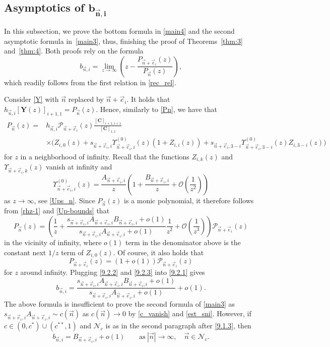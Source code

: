 \documentclass[pdftex]{sigma}
\numberwithin{equation}{section}
\newcommand{\n}{{\vec n}}
\begin{document}
\subsection[Asymptotics of b\_n,i]{Asymptotics of $\boldsymbol{b_{\n,i} }$}

In this subsection, we prove the bottom formula in \eqref{main4} and the second asymptotic formula in~\eqref{main3}, thus, finishing the proof of Theorems~\ref{thm:3} and~\ref{thm:4}. Both proofs rely on the formula
\begin{equation}
\label{9.2.1}
b_{\n,i} = \lim_{z\to\infty} \left( z - \frac{P_{\n+\vec e_i}(z)}{P_\n(z)} \right),
\end{equation}
which readily follows from the first relation in \eqref{rec_rel}.

Consider \eqref{Y} with $ \n $ replaced by $ \n+\vec e_i $. It holds that $ h_{\n,i}[\boldsymbol Y(z)]_{i+1,1} = P_\n(z) $. Hence, similarly to \eqref{Pn}, we have that
\begin{align*}
P_\n(z) ={}& h_{\n,i} \mathcal P_{\n+\vec e_i}(z)\frac{[\boldsymbol C]_{i+1,i+1}}{[\boldsymbol C]_{1,1}} \\
&\times\bigl( Z_{i,0}(z) + s_{\n+\vec e_i,i}\Upsilon_{\n+\vec e_i,i}^{(0)}(z)(1+Z_{i,i}(z)) + s_{\n+\vec e_i,3-i}\Upsilon_{\n+\vec e_i,3-i}^{(0)}(z)Z_{i,3-i}(z) \bigr)
\end{align*}
for $ z $ in a neighborhood of infinity. Recall that the functions $ Z_{i,k}(z) $ and $ \Upsilon_{\n+\vec e_i,k}(z) $ vanish at infinity and
\[
\Upsilon_{\n+\vec e_i,i}^{(0)}(z) = \frac{A_{\n+\vec e_i,i}}z\left(1 + \frac{B_{\n+\vec e_i,i}}z + \mathcal O\left(\frac1{z^2}\right) \right)
\]
as $ z\to\infty $, see \eqref{Ups_n}. Since $ P_\n(z) $ is a monic polynomial, it therefore follows from \eqref{rhz-1} and \eqref{Up-bounds} that
\begin{equation}
\label{9.2.2}
P_\n(z) = \left( \frac 1z + \frac{s_{\n+\vec e_i,i}A_{\n+\vec e_i,i}B_{\n+\vec e_i,i}+o(1)}{s_{\n+\vec e_i,i}A_{\n+\vec e_i,i} + o(1)} \frac1{z^2} + \mathcal O\left(\frac1{z^3}\right) \right) \mathcal P_{\n+\vec e_i}(z)
\end{equation}
in the vicinity of infinity, where $ o(1) $ term in the denominator above is the constant next $ 1/z $ term of $ Z_{i,0}(z) $. Of course, it also holds that
\begin{equation}
\label{9.2.3}
P_{\n+\vec e_i}(z) = (1 + o(1) ) \mathcal P_{\n+\vec e_i}(z)
\end{equation}
for $ z $ around infinity. Plugging \eqref{9.2.2} and \eqref{9.2.3} into \eqref{9.2.1} gives
\[
b_{\n,i} = \frac{s_{\n+\vec e_i,i}A_{\n+\vec e_i,i}B_{\n+\vec e_i,i}+o(1)}{s_{\n+\vec e_i,i}A_{\n+\vec e_i,i} + o(1)} + o(1).
\]
The above formula is insufficient to prove the second formula of \eqref{main3} as $ s_{\n+\vec e_i,i}A_{\n+\vec e_i,i} \sim c(\n) $ as $ c(\n) \to 0 $ by \eqref{c_vanish} and \eqref{est_sni}. However, if $ c\in(0,c^*) \cup (c^{**},1) $ and $ \mathcal N_c $ is as in the second paragraph after \eqref{9.1.3}, then
\begin{equation}
\label{9.2.4}
b_{\n,i} = B_{\n+\vec e_i,i}+o(1) \qquad \text{as} \ |\n| \to\infty, \quad \n\in \mathcal N_c.
\end{equation}
\end{document}

